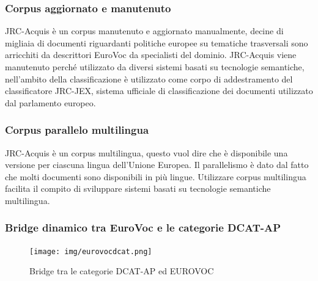 \documentclass{article}
\theoremstyle{plain}
\theoremstyle{definition}
\begin{document}
\subsubsection{Corpus aggiornato e manutenuto}
JRC-Acquis è un corpus manutenuto e aggiornato manualmente, decine di migliaia di documenti riguardanti politiche europee su tematiche trasversali sono arricchiti da descrittori EuroVoc da specialisti del dominio. JRC-Acquis viene manutenuto perché utilizzato da diversi sistemi basati su tecnologie semantiche, nell'ambito della classificazione è utilizzato come corpo di addestramento del classificatore JRC-JEX, sistema ufficiale di classificazione dei documenti utilizzato dal parlamento europeo.

\subsubsection{Corpus parallelo multilingua}
JRC-Acquis è un corpus multilingua, questo vuol dire che è disponibile una versione per ciascuna lingua dell'Unione Europea. Il parallelismo è dato dal fatto che molti documenti sono disponibili in più lingue. Utilizzare corpus multilingua facilita il compito di sviluppare sistemi basati su tecnologie semantiche multilingua.

\newpage
\subsubsection{Bridge dinamico tra EuroVoc e le categorie DCAT-AP}
\begin{figure}[htbp]
\begin{center}
\texttt{[image: img/eurovocdcat.png]}
\caption{Bridge tra le categorie DCAT-AP ed EUROVOC}
\end{center}
\end{figure}
\end{document}
